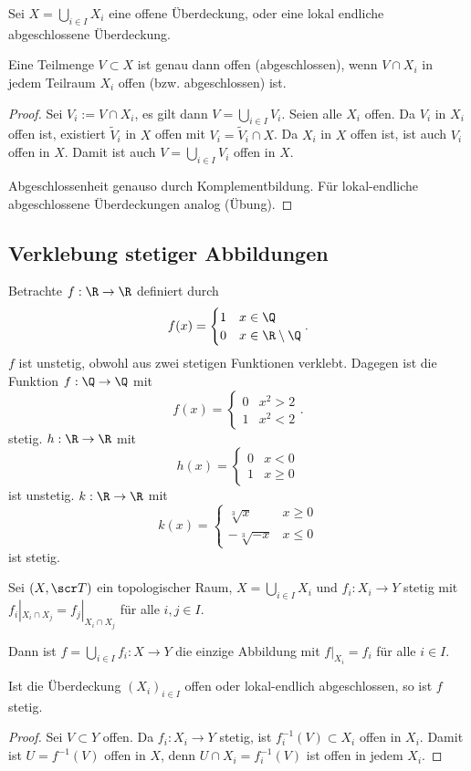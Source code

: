 \begin{st} %
	Sei $X = \bigcup_{i\in I} X_i$ eine offene Überdeckung, oder eine lokal endliche abgeschlossene Überdeckung.

	Eine Teilmenge $V \subset X$ ist genau dann offen (abgeschlossen), wenn $V \cap X_i$ in jedem Teilraum $X_i$ offen (bzw. abgeschlossen) ist.
	\begin{proof}
		Sei $V_i := V \cap X_i$, es gilt dann $V = \bigcup_{i\in I} V_i$.
		Seien alle $X_i$ offen.
		Da $V_i$ in $X_i$ offen ist, existiert $\tilde V_i$ in $X$ offen mit $V_i = \tilde V_i \cap X$.
		Da $X_i$ in $X$ offen ist, ist auch $V_i$ offen in $X$.
		Damit ist auch $V = \bigcup_{i\in I} V_i$ offen in $X$.

		Abgeschlossenheit genauso durch Komplementbildung.
		Für lokal-endliche abgeschlossene Überdeckungen analog (Übung). %
	\end{proof}
\end{st}

\subsection{Verklebung stetiger Abbildungen}

Betrachte $f: \R \to \R$ definiert durch
\[
	f(x) = \begin{cases}
		1 & x \in \Q \\
		0 & x \in \R \setminus \Q
	\end{cases}.
\]
$f$ ist unstetig, obwohl aus zwei stetigen Funktionen verklebt.
Dagegen ist die Funktion $f: \Q \to \Q$ mit
\[
	f(x) = \begin{cases}
		0 & x^2 > 2 \\
		1 & x^2 < 2
	\end{cases}.
\]
stetig.
$h : \R \to \R$ mit
\[
	h(x) = \begin{cases}
		0 & x < 0 \\
		1 & x \ge 0
	\end{cases}
\]
ist unstetig.
$k : \R \to \R$ mit
\[
	k(x) = \begin{cases}
		\sqrt[3]{x} & x \ge 0 \\
		-\sqrt[3]{-x} & x \le 0
	\end{cases}
\]
ist stetig.

\begin{st}
	Sei $(X, \scr T)$ ein topologischer Raum, $X = \bigcup_{i \in I} X_i$ und $f_i: X_i \to Y$ stetig mit $f_i|_{X_i \cap X_j} = f_j|_{X_i \cap X_j}$ für alle $i,j \in I$.

	Dann ist $f = \bigcup_{i \in I} f_i : X \to Y$ die einzige Abbildung mit $f|_{X_i} = f_i$ für alle $i \in I$.

	Ist die Überdeckung $(X_i)_{i\in I}$ offen oder lokal-endlich abgeschlossen, so ist $f$ stetig.
	\begin{proof}
		Sei $V \subset Y$ offen.
		Da $f_i : X_i \to Y$ stetig, ist $f_i^{-1}(V) \subset X_i$ offen in $X_i$.
		Damit ist $U = f^{-1}(V)$ offen in $X$, denn $U \cap X_i = f_i^{-1}(V)$ ist offen in jedem $X_i$.
	\end{proof}
\end{st}

